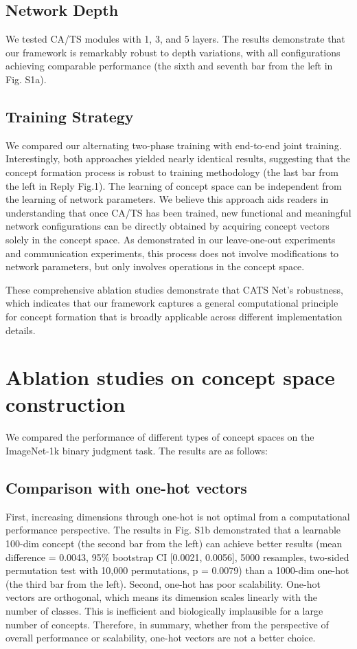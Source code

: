 \documentclass[pdflatex,sn-mathphys-num,lineno]{sn-jnl}%
\begin{document}
\begin{CJK}{UTF8}{gbsn}
\subsection{Network Depth}
We tested CA/TS modules with 1, 3, and 5 layers. The results demonstrate that our framework is remarkably robust to depth variations, with all configurations achieving comparable performance (the sixth and seventh bar from the left in Fig. S1a). 

\subsection{Training Strategy}
We compared our alternating two-phase training with end-to-end joint training. Interestingly, both approaches yielded nearly identical results, suggesting that the concept formation process is robust to training methodology (the last bar from the left in Reply Fig.1). The learning of concept space can be independent from the learning of network parameters. We believe this approach aids readers in understanding that once CA/TS has been trained, new functional and meaningful network configurations can be directly obtained by acquiring concept vectors solely in the concept space. As demonstrated in our leave-one-out experiments and communication experiments, this process does not involve modifications to network parameters, but only involves operations in the concept space.

These comprehensive ablation studies demonstrate that CATS Net's robustness, which indicates that our framework captures a general computational principle for concept formation that is broadly applicable across different implementation details.

\section{Ablation studies on concept space construction}

We compared the performance of different types of concept spaces on the ImageNet-1k binary judgment task. The results are as follows:

\subsection{Comparison with one-hot vectors}
First, increasing dimensions through one-hot is not optimal from a computational performance perspective. The results in Fig. S1b demonstrated that a learnable 100-dim concept (the second bar from the left) can achieve better results (mean difference = 0.0043, 95\% bootstrap CI [0.0021, 0.0056], 5000 resamples, two-sided permutation test with 10,000 permutations, p = 0.0079) than a 1000-dim one-hot (the third bar from the left). Second, one-hot has poor scalability. One-hot vectors are orthogonal, which means its dimension scales linearly with the number of classes. This is inefficient and biologically implausible for a large number of concepts. Therefore, in summary, whether from the perspective of overall performance or scalability, one-hot vectors are not a better choice.


\end{CJK}
\end{document}
